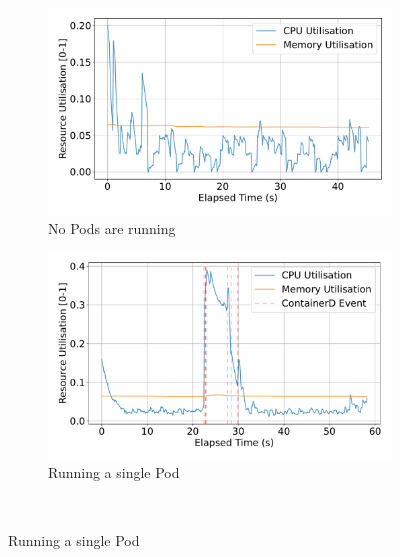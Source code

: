 \begin{figure}[ht!] %
    \centering %

    \begin{subfigure}[b]{0.48\textwidth} %
        \centering
        \includegraphics[width=\linewidth]{images/filter-utilisation-baseline.pdf}
        \caption{No Pods are running} %
        \label{fig:filter-utilisation-baseline} %
    \end{subfigure}%
    \hfill %
    \begin{subfigure}[b]{0.48\textwidth}
        \centering
        \includegraphics[width=\linewidth]{images/filter-utilisation-single.pdf}
        \caption{Running a single Pod} %
        \label{fig:filter-utilisation-single}
    \end{subfigure}
    \\[1em] %


\end{figure}
